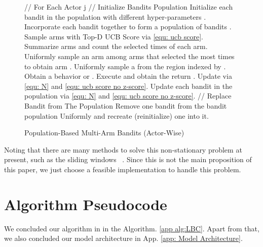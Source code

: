 \begin{figure}[ht]
  \centering
  \begin{minipage}{.9\linewidth}
    \begin{algorithm}[H]
      \caption{Population-Based Multi-Arm Bandits (Actor-Wise)}  
          \begin{algorithmic}
          \STATE // For Each Actor j
          \STATE // Initialize Bandits Population
            \STATE Initialize each bandit   in the population with different hyper-parameters .
                \STATE Incorporate each bandit together to form a population of bandits .
            \STATE Sample  arms  with Top-D UCB Score via \eqref{equ: ucb score}.
            \ENDFOR
            \STATE Summarize  arms and count the selected times of each arm.
            \STATE Uniformly sample an arm among arms that selected the most times to obtain arm .
            \STATE Uniformly sample a  from  the region indexed by .
            \STATE Obtain a behavior  or .
            \STATE Execute  and obtain the return .
            \STATE Update  via  \eqref{equ: N} and \eqref{equ: ucb score no z-score}.
            \ENDFOR
            \STATE Update each bandit in the population via  \eqref{equ: N} and \eqref{equ: ucb score no z-score}.
            \STATE // Replace Bandit from The Population
            \STATE Remove one bandit from the bandit population Uniformly and recreate (reinitialize) one into it.
            \ENDIF
            \ENDFOR
          \end{algorithmic}  
        \label{alg:bva}
    \end{algorithm}
  \end{minipage}
\end{figure}


Noting that there are many methods to solve this non-stationary problem at present, such as the sliding windows ~\citep{agent57}. Since this is not the main proposition of this paper, we just choose a feasible implementation to handle this problem.

\clearpage

\section{Algorithm Pseudocode}
\label{app: Algorithm Pseudocode}
We concluded our algorithm in in the Algorithm. \ref{app alg:LBC}. Apart from that, we also concluded our model architecture in App. \ref{app: Model Architecture}.

